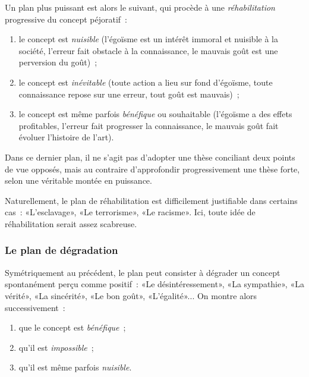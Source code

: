 \documentclass[a4paper,11pt]{article}
\begin{document}
\par

Un plan plus puissant est alors le suivant, qui procède à une
\emph{réhabilitation} progressive du concept péjoratif~:

\begin{enumerate}
\item le concept est \emph{nuisible} (l'égoïsme est un intérêt immoral
  et nuisible à la société, l'erreur fait obstacle à la connaissance, le
  mauvais goût est une perversion du goût)~;
\item le concept est \emph{inévitable} (toute action a lieu sur fond
  d'égoïsme, toute connaissance repose sur une erreur, tout goût est
  mauvais)~;
\item le concept est même parfois \emph{bénéfique} ou souhaitable
  (l'égoïsme a des effets profitables, l'erreur fait progresser la
  connaissance, le mauvais goût fait évoluer l'histoire de l'art).
\end{enumerate}

\par

Dans ce dernier plan, il ne s'agit pas d'adopter une thèse conciliant
deux points de vue opposés, mais au contraire d'approfondir
progressivement une thèse forte, selon une véritable montée en
puissance. 

\par

Naturellement, le plan de réhabilitation est difficilement justifiable
dans certains cas~: «L'esclavage», «Le terrorisme», «Le racisme». Ici,
toute idée de réhabilitation serait assez scabreuse.


\subsubsection{Le plan de dégradation}

Symétriquement au précédent, le plan peut consister à dégrader un
concept spontanément perçu comme positif~: «Le désintéressement», «La
sympathie», «La vérité», «La sincérité», «Le bon goût»,
«L'égalité»... On montre alors successivement~:
\begin{enumerate}
\item que le concept est \emph{bénéfique}~;
\item qu'il est \emph{impossible}~;
\item qu'il est même parfois \emph{nuisible}.
\end{enumerate}
\end{document}
